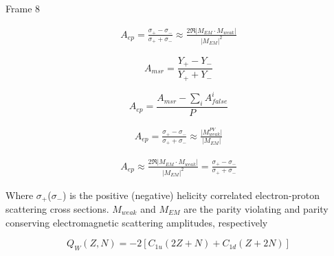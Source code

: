 \documentclass[xcolor=x11names,compress,8pt]{beamer}
\renewcommand{\(}{\begin{columns}}
\renewcommand{\)}{\end{columns}}
\newcommand{\<}[1]{\begin{column}{#1}}
\renewcommand{\>}{\end{column}}
\begin{document}
\begin{frame}{Frame 8}

\begin{equation} \label{equ:qweak6}
\begin{split}
A_{ep} = \frac{ \sigma_{+} - \sigma_{-} }{ \sigma_{+} + \sigma_{-} } \approx \frac{2 \Re \vert M_{EM}\cdot M_{weak} \vert }{\vert M_{EM} \vert^{2} }
\end{split}
\end{equation}

\pause

\begin{equation} \label{equ:qweak61}
A_{msr} = \frac{ Y_{+} - Y_{-} }{ Y_{+} + Y_{-} }
\end{equation}

 
\begin{equation} \label{equ:qweak62}
A_{ep} = \frac{ A_{msr} -  \displaystyle\sum_{i} A^{i}_{false} }{ P }
\end{equation}

\begin{equation} \label{equ:qweak64}
\begin{split}
A_{ep} = \frac{ \sigma_{+} - \sigma_{-} }{ \sigma_{+} + \sigma_{-} } \approx \frac{\vert M_{weak}^{PV} \vert }{\vert M_{EM} \vert }
\end{split}
\end{equation}

\begin{equation} \label{equ:qweak63}
\begin{split}
A_{ep} \approx \frac{2 \Re \vert M_{EM}\cdot M_{weak} \vert }{\vert M_{EM} \vert^{2} } = \frac{ \sigma_{+} - \sigma_{-} }{ \sigma_{+} + \sigma_{-} }
\end{split}
\end{equation}



Where $\sigma_{+}$($\sigma_{-}$) is the positive (negative) helicity correlated electron-proton scattering cross sections. $M_{weak}$ and $M_{EM}$ are the parity violating and parity conserving electromagnetic scattering amplitudes, respectively


\begin{equation} \label{equ:qweak7}
Q_{W}(Z,N) = -2[C_{1u}(2Z+N) +  C_{1d}(Z+2N) ]
\end{equation}

\end{frame}
\end{document}
